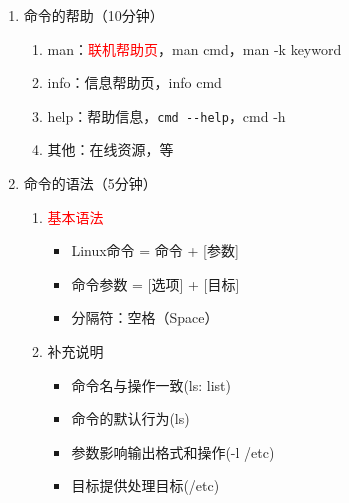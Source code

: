 \documentclass{TIJMUjiaoanSY}
\begin{document}


\firstTail


\newpage
\otherHeader

\noindent
\begin{enumerate}
  \item 命令的帮助（10分钟）
    \begin{enumerate}
      \item man：\textcolor{red}{联机帮助页}，man cmd，man -k keyword
      \item info：信息帮助页，info cmd
      \item help：帮助信息，\verb|cmd --help|，cmd -h
      \item 其他：在线资源，等
    \end{enumerate}
  \item 命令的语法（5分钟）
    \begin{enumerate}
      \item \textcolor{red}{基本语法}
        \begin{itemize}
	  \item Linux命令 = 命令 + [参数] 
	  \item 命令参数 = [选项] + [目标]
	  \item 分隔符：空格（Space）
	\end{itemize}
      \item 补充说明
	\begin{itemize}
	  \item 命令名与操作一致(ls: list)
	  \item 命令的默认行为(ls)
	  \item 参数影响输出格式和操作(-l /etc)
	  \item 目标提供处理目标(/etc)

\end{itemize}
\end{enumerate}
\end{enumerate}
\end{document}
